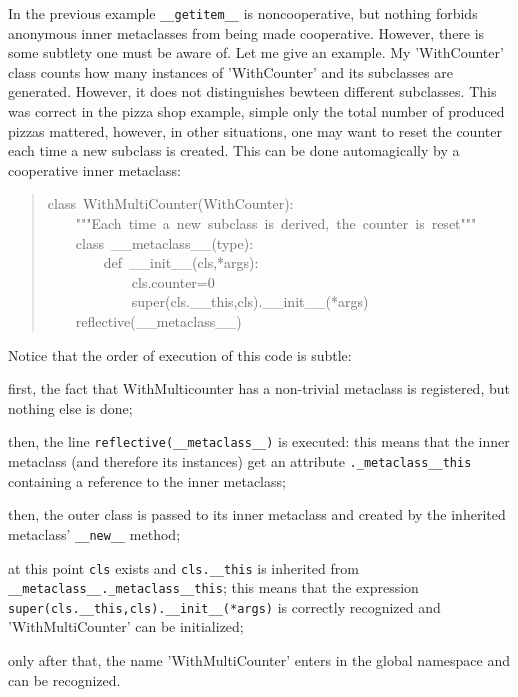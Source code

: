 \documentclass[10pt,english]{article}
\begin{document}
In the previous example \texttt{{\_}{\_}getitem{\_}{\_}} is noncooperative, but nothing
forbids anonymous inner metaclasses from being made cooperative. However,
there is some subtlety one must be aware of.
Let me give an example. My 'WithCounter' class counts how many instances
of 'WithCounter' and its subclasses are generated. However, it does not
distinguishes bewteen different subclasses. 
This was correct in the pizza shop example, simple only the total
number of produced pizzas mattered, however, in other situations,
one may want to reset the counter each time a new subclass is created. 
This can be done automagically by a cooperative inner metaclass:
\begin{quote}
\begin{ttfamily}\begin{flushleft}
\mbox{class~WithMultiCounter(WithCounter):}\\
\mbox{~~~~"""Each~time~a~new~subclass~is~derived,~the~counter~is~reset"""}\\
\mbox{~~~~class~{\_}{\_}metaclass{\_}{\_}(type):}\\
\mbox{~~~~~~~~def~{\_}{\_}init{\_}{\_}(cls,*args):}\\
\mbox{~~~~~~~~~~~~cls.counter=0}\\
\mbox{~~~~~~~~~~~~super(cls.{\_}{\_}this,cls).{\_}{\_}init{\_}{\_}(*args)}\\
\mbox{~~~~reflective({\_}{\_}metaclass{\_}{\_})}
\end{flushleft}\end{ttfamily}
\end{quote}

Notice that the order of execution of this code is subtle:
\begin{list}{)}
{
\setlength{\rightmargin}{\leftmargin}
}
\item {} 
first, the fact that WithMulticounter has a non-trivial metaclass is
registered, but nothing else is done;

\item {} 
then, the line \texttt{reflective({\_}{\_}metaclass{\_}{\_})} is executed: this means
that the inner metaclass (and therefore its instances) get an
attribute \texttt{.{\_}metaclass{\_}{\_}this} containing a reference to the
inner metaclass;

\item {} 
then, the outer class is passed to its inner metaclass and created
by the inherited metaclass' \texttt{{\_}{\_}new{\_}{\_}} method;

\item {} 
at this point  \texttt{cls} exists and \texttt{cls.{\_}{\_}this} is inherited from
\texttt{{\_}{\_}metaclass{\_}{\_}.{\_}metaclass{\_}{\_}this}; this means that the expression
\texttt{super(cls.{\_}{\_}this,cls).{\_}{\_}init{\_}{\_}(*args)} is correctly recognized and
'WithMultiCounter' can be initialized;

\item {} 
only after that, the name 'WithMultiCounter' enters in the global namespace
and can be recognized.

\end{list}
\end{document}

